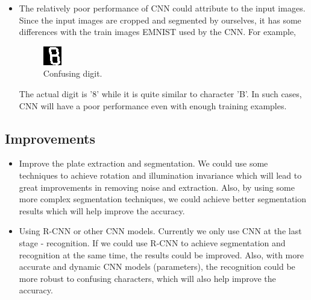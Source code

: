 \documentclass{article}
\begin{document}
\begin{spacing}{1.0}
\begin{itemize}
	\item The relatively poor performance of CNN could attribute to the input images. Since the input images are cropped and segmented by ourselves, it has some differences with the train images EMNIST used by the CNN. For example, 
	\begin{figure}[H]
		\begin{center}
			\includegraphics[scale=0.6]{confuse_digit.jpg}
			\caption{Confusing digit.}
		\end{center}
	\end{figure}
	The actual digit is '8' while it is quite similar to character 'B'. In such cases, CNN will have a poor performance even with enough training examples.
\end{itemize}

\subsection{Improvements}
\begin{itemize}
	\item Improve the plate extraction and segmentation. We could use some techniques to achieve rotation and illumination invariance which will lead to great improvements in removing noise and extraction. Also, by using some more complex segmentation techniques, we could achieve better segmentation results which will help improve the accuracy.
	
	\item Using R-CNN or other CNN models. Currently we only use CNN at the last stage - recognition. If we could use R-CNN to achieve segmentation and recognition at the same time, the results could be improved. Also, with more accurate and dynamic CNN models (parameters), the recognition could be more robust to confusing characters, which will also help improve the accuracy.
\end{itemize}

\end{spacing}

\end{document}
